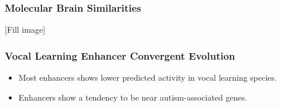 \documentclass[10pt]{article}
\begin{document}
\subsubsection*{Molecular Brain Similarities}
[Fill image]

\subsubsection*{Vocal Learning Enhancer Convergent Evolution}
\begin{itemize}
	\item Most enhancers shows lower predicted activity in vocal learning species.
	\item Enhancers show a tendency to be near autism-associated genes.
\end{itemize}
\end{document}

